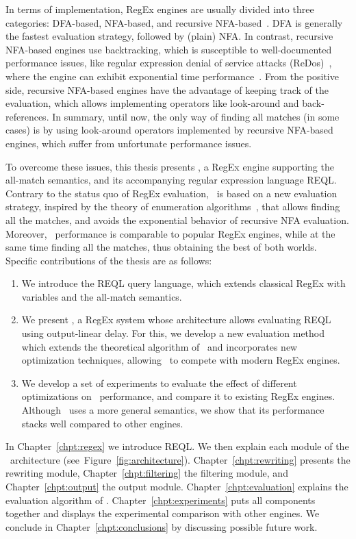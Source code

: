 In terms of implementation, RegEx engines are usually divided into three
categories: DFA-based, NFA-based, and recursive NFA-based~\cite{cox2007regular}.
DFA is generally the fastest evaluation strategy, followed by (plain) NFA. In
contrast, recursive NFA-based engines use backtracking, which is susceptible to
well-documented performance issues, like regular expression denial of service
attacks (ReDos)~\cite{friedl2006mastering}, where the engine can exhibit
exponential time performance~\cite{cox2007regular}. From the positive side,
recursive NFA-based engines have the advantage of keeping track of the
evaluation, which allows implementing operators like look-around and
back-references. In summary, until now, the only way of finding all matches (in
some cases) is by using look-around operators implemented by recursive NFA-based
engines, which suffer from unfortunate performance issues. 

To overcome these issues, this thesis presents \rematch, a RegEx engine
supporting the all-match semantics, and its accompanying regular expression
language REQL. Contrary to the status quo of RegEx evaluation, \rematch\ is
based on a new evaluation strategy, inspired by the theory of enumeration
algorithms~\cite{Segoufin13}, that allows finding all the matches, and avoids
the exponential behavior of recursive NFA evaluation. Moreover, \rematch\
performance is comparable to popular RegEx engines, while at the same time
finding all the matches, thus obtaining the best of both worlds. Specific
contributions of the thesis are as follows:

\begin{enumerate}

\item  We introduce the REQL query language, which extends classical RegEx with
variables and the all-match semantics.	

\item We present \rematch, a RegEx system whose architecture allows evaluating
REQL using output-linear delay. For this, we develop a new evaluation method
which extends the theoretical algorithm of~\cite{FlorenzanoRUVV20} and
incorporates new optimization techniques, allowing \rematch\ to compete with
modern RegEx engines. 

\item We develop a set of experiments to evaluate the effect of different
optimizations on \rematch\ performance, and compare it to existing RegEx
engines. Although \rematch\ uses a more general semantics, we show that its
performance stacks well compared to other engines.
	
\end{enumerate}

In Chapter~\ref{chpt:regex} we introduce REQL. We then explain each module of
the \rematch\ architecture (see~Figure~\ref{fig:architecture}).
Chapter~\ref{chpt:rewriting} presents the rewriting module,
Chapter~\ref{chpt:filtering} the filtering module, and Chapter~\ref{chpt:output}
the output module. Chapter~\ref{chpt:evaluation} explains the evaluation
algorithm of \rematch. Chapter~\ref{chpt:experiments} puts all components
together and displays the experimental comparison with other engines. We
conclude in Chapter~\ref{chpt:conclusions} by discussing possible future work. 
